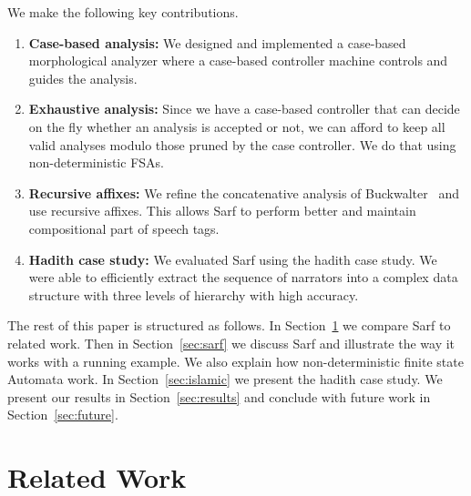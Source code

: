 \documentclass[11pt,letterpaper]{article}
\begin{document}

We make the following key contributions. 
\begin{enumerate}
\item {\bf Case-based analysis:}  We designed and implemented
a case-based morphological analyzer where a case-based controller
machine controls and guides the analysis. 
\item {\bf Exhaustive analysis:} Since we have a case-based 
controller that can decide on the fly whether an analysis is 
accepted or not, we can afford to keep all valid analyses modulo
those pruned by the case controller. 
We do that using non-deterministic FSAs. 
\item {\bf Recursive affixes:}
We refine the concatenative analysis of 
Buckwalter~  and use recursive affixes. 
This allows Sarf to perform better and 
maintain compositional part of speech tags.
\item {\bf Hadith case study:}
We evaluated Sarf using the hadith case study. We were able to
efficiently extract the sequence of narrators into a complex
data structure with three levels of hierarchy with high accuracy. 
\end{enumerate}




The rest of this paper is structured as follows. In Section~\ref{sec:related}
we compare Sarf to related work. Then in Section~\ref{sec:sarf}
we discuss Sarf and illustrate the way it works with a running example.
We also explain how non-deterministic finite state Automata
work. In Section~\ref{sec:islamic} we present the hadith case
study. We present our results in Section~\ref{sec:results}
and conclude with future work in Section~\ref{sec:future}.


\section{Related Work }
\label{sec:related}
\end{document}
